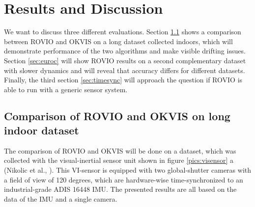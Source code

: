 \chapter{Results and Discussion}
\label{sec:results}

We want to discuss three different evaluations. Section \ref{sec:ijrr} shows a comparison between ROVIO and OKVIS on a long dataset collected indoors, which will demonstrate performance of the two algorithms and make visible drifting issues. Section \ref{sec:euroc} will show ROVIO results on a second complementary dataset with slower dynamics and will reveal that accuracy differs for different datasets. Finally, the third section \ref{sec:timesync} will approach the question if ROVIO is able to run with a generic sensor system.

\section{Comparison of ROVIO and OKVIS on long indoor dataset}
\label{sec:ijrr}

The comparison of ROVIO and OKVIS will be done on a dataset, which was collected with the visual-inertial sensor unit shown in figure \ref{pics:visensor} a (Nikolic et al., \cite{nikolic2014synchronized}). This VI-sensor is equipped with two global-shutter cameras with a field of view of 120 degrees, which are hardware-wise time-synchronized to an industrial-grade ADIS 16448 IMU. The presented results are all based on the data of the IMU and a single camera.

